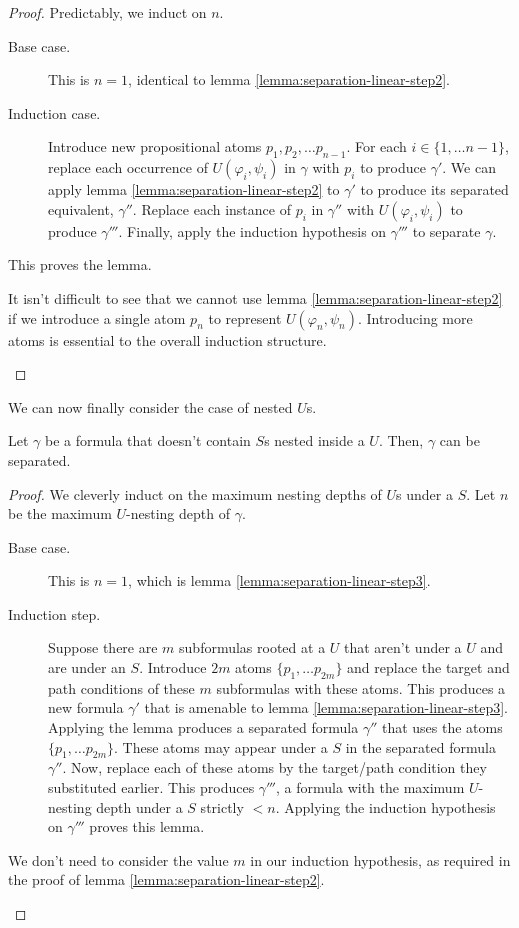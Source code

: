 \documentclass[a4paper,UKenglish,cleveref, autoref, thm-restate, numberwithinsect]{lipics-v2021}
\begin{document}
\begin{proof}
    Predictably, we induct on $n$.
    \begin{description}
        \item[Base case.] This is $n = 1$, identical to lemma \ref{lemma:separation-linear-step2}.
        \item[Induction case.] Introduce new propositional atoms $p_1, p_2, \ldots p_{n-1}$. For each $i \in \{1, \ldots n - 1\}$, replace each occurrence of $U(\varphi_i, \psi_i)$ in $\gamma$ with $p_i$ to produce $\gamma'$. We can apply lemma \ref{lemma:separation-linear-step2} to $\gamma'$ to produce its separated equivalent, $\gamma''$. Replace each instance of $p_i$ in $\gamma''$ with $U(\varphi_i, \psi_i)$ to produce $\gamma'''$. Finally, apply the induction hypothesis on $\gamma'''$ to separate $\gamma$.
    \end{description}
    This proves the lemma.
    \begin{remark*}
        It isn't difficult to see that we cannot use lemma \ref{lemma:separation-linear-step2} if we introduce a single atom $p_n$ to represent $U(\varphi_n, \psi_n)$. Introducing more atoms is essential to the overall induction structure.
    \end{remark*}
\end{proof}
We can now finally consider the case of nested $U$s.
\begin{lemma}
    \label{lemma:separation-linear-step4}
    Let $\gamma$ be a formula that doesn't contain $S$s nested inside a $U$. Then, $\gamma$ can be separated.
\end{lemma}
\begin{proof}
    We cleverly induct on the maximum nesting depths of $U$s under a $S$. Let $n$ be the maximum $U$-nesting depth of $\gamma$.
    \begin{description}
        \item[Base case.] This is $n = 1$, which is lemma \ref{lemma:separation-linear-step3}.
        \item[Induction step.] Suppose there are $m$ subformulas rooted at a $U$ that aren't under a $U$ and are under an $S$. Introduce $2m$ atoms $\{p_1, \ldots p_{2m}\}$ and replace the target and path conditions of these $m$ subformulas with these atoms. This produces a new formula $\gamma'$ that is amenable to lemma \ref{lemma:separation-linear-step3}. Applying the lemma produces a separated formula $\gamma''$ that uses the atoms $\{p_1, \ldots p_{2m}\}$. These atoms may appear under a $S$ in the separated formula $\gamma''$. Now, replace each of these atoms by the target/path condition they substituted earlier. This produces $\gamma'''$, a formula with the maximum $U$-nesting depth under a $S$ strictly $< n$. Applying the induction hypothesis on $\gamma'''$ proves this lemma.
    \end{description}
    \begin{remark*}
        We don't need to consider the value $m$ in our induction hypothesis, as required in the proof of lemma \ref{lemma:separation-linear-step2}.
    \end{remark*}
\end{proof}
\end{document}
